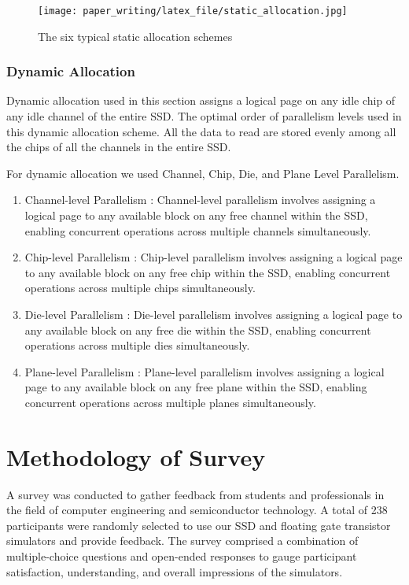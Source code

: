 \documentclass[conference]{paper_writing/latex_file/IEEEtran}
\begin{document}
\begin{figure}[h]
    \centering
    \texttt{[image: paper\_writing/latex\_file/static\_allocation.jpg]}
    \caption{The six typical static allocation schemes}
    \label{fig:static_allocation}
\end{figure}
\subsubsection{Dynamic Allocation}
Dynamic allocation used in this section assigns a logical page on any idle chip of any idle channel of the entire SSD. The optimal order of parallelism levels used in this dynamic allocation scheme. All the data to read are stored evenly among all the chips of all the channels in the entire SSD. 

For dynamic allocation we used Channel, Chip, Die, and Plane Level Parallelism. 
\begin{enumerate}
    \item Channel-level Parallelism : Channel-level parallelism involves assigning a logical page to any available block on any free channel within the SSD, enabling concurrent operations across multiple channels simultaneously.
    \item Chip-level Parallelism : Chip-level parallelism involves assigning a logical page to any available block on any free chip within the SSD, enabling concurrent operations across multiple chips simultaneously.
    \item Die-level Parallelism : Die-level parallelism involves assigning a logical page to any available block on any free die within the SSD, enabling concurrent operations across multiple dies simultaneously.
    \item Plane-level Parallelism : Plane-level parallelism involves assigning a logical page to any available block on any free plane within the SSD, enabling concurrent operations across multiple planes simultaneously.
\end{enumerate}

\section{Methodology of Survey}
A survey was conducted to gather feedback from students and professionals in the field of computer engineering and semiconductor technology. A total of 238 participants were randomly selected to use our SSD and floating gate transistor simulators and provide feedback. The survey comprised a combination of multiple-choice questions and open-ended responses to gauge participant satisfaction, understanding, and overall impressions of the simulators.
\end{document}
